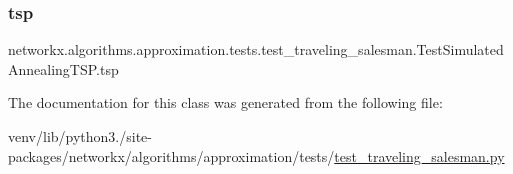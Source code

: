 \subsubsection{\texorpdfstring{tsp}{tsp}}
{\footnotesize\ttfamily networkx.\+algorithms.\+approximation.\+tests.\+test\+\_\+traveling\+\_\+salesman.\+Test\+Simulated\+Annealing\+T\+S\+P.\+tsp\hspace{0.3cm}{\ttfamily [static]}}



The documentation for this class was generated from the following file\+:\begin{DoxyCompactItemize}
\item 
venv/lib/python3./site-\/packages/networkx/algorithms/approximation/tests/\hyperlink{test__traveling__salesman_8py}{test\+\_\+traveling\+\_\+salesman.\+py}\end{DoxyCompactItemize}
